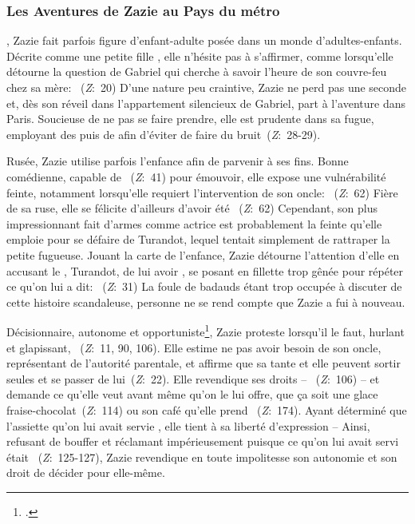 \subsubsection{Les Aventures de Zazie au Pays du métro}
, Zazie fait parfois figure d'enfant-adulte posée dans un monde d'adultes-enfants.
Décrite comme une petite fille , elle n'hésite pas à s'affirmer, comme lorsqu'elle détourne la question de Gabriel qui cherche à savoir l'heure de son couvre-feu chez sa mère: ~(\textit{Z}:~20)
D'une nature peu craintive, Zazie ne perd pas une seconde et, dès son réveil dans l'appartement silencieux de Gabriel, part à l'aventure dans Paris.
Soucieuse de ne pas se faire prendre, elle est prudente dans sa fugue, employant des  puis de  afin d'éviter de faire du bruit~(\textit{Z}:~28-29).
\par
Rusée, Zazie utilise parfois l'enfance afin de parvenir à ses fins.
Bonne comédienne, capable de ~(\textit{Z}:~41) pour émouvoir, elle expose une vulnérabilité feinte, notamment lorsqu'elle requiert l'intervention de son oncle: ~(\textit{Z}:~62)
Fière de sa ruse, elle se félicite d'ailleurs d'avoir été ~(\textit{Z}:~62)
Cependant, son plus impressionnant fait d'armes comme actrice est probablement la feinte qu'elle emploie pour se défaire de Turandot, lequel tentait simplement de rattraper la petite fugueuse.
Jouant la carte de l'enfance, Zazie détourne l'attention d'elle en accusant le , Turandot, de lui avoir , se posant en fillette trop gênée pour répéter ce qu'on lui a dit: ~(\textit{Z}:~31)
La foule de badauds étant trop occupée à discuter de cette histoire scandaleuse, personne ne se rend compte que Zazie a fui à nouveau.
\par
Décisionnaire, autonome et opportuniste\footcite[88]{Maurin2007}, Zazie proteste lorsqu'il le faut, hurlant et glapissant, ~(\textit{Z}:~11, 90, 106).
Elle estime ne pas avoir besoin de son oncle, représentant de l'autorité parentale, et affirme que sa tante et elle peuvent sortir seules et se passer de lui~(\textit{Z}:~22).
Elle revendique ses droits -- ~(\textit{Z}:~106) -- et demande ce qu'elle veut avant même qu'on le lui offre, que ça soit une glace fraise-chocolat~(\textit{Z}:~114) ou son café qu'elle prend ~(\textit{Z}:~174).
Ayant déterminé que l'assiette qu'on lui avait servie , elle tient à sa liberté d'expression --  Ainsi, refusant de bouffer  et réclamant impérieusement  puisque ce qu'on lui avait servi était ~(\textit{Z}:~125-127), Zazie revendique en toute impolitesse son autonomie et son droit de décider pour elle-même.

